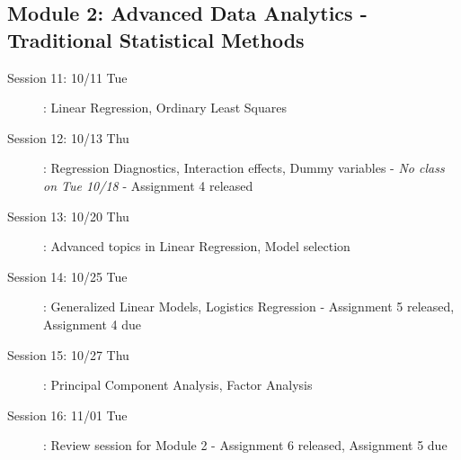 \documentclass[11pt, letterpaper, twoside]{memoir}\usepackage{knitr}
\begin{document}
\subsection{Module 2: Advanced Data Analytics - Traditional Statistical Methods}
\begin{description}
\item [Session 11: 10/11 Tue]: Linear Regression, Ordinary Least Squares

\item [Session 12: 10/13 Thu]: Regression Diagnostics, Interaction effects, Dummy variables 
    - \emph{No class on Tue 10/18}
    - Assignment 4 released

\item [Session 13: 10/20 Thu]: Advanced topics in Linear Regression, Model selection
    
\item [Session 14: 10/25 Tue]: Generalized Linear Models, Logistics Regression
    - Assignment 5 released, Assignment 4 due
    

\item [Session 15: 10/27 Thu]: Principal Component Analysis, Factor Analysis
   
    
    
\item [Session 16: 11/01 Tue]: Review session for Module 2
    - Assignment 6 released, Assignment 5 due
\end{description}
\end{document}
